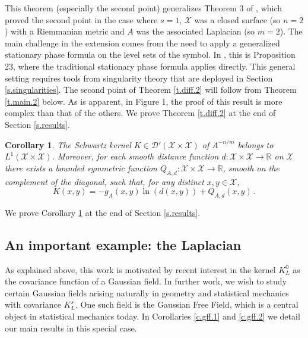 \documentclass[10pt,twoside]{article}
\newcommand{\R}{\mathbb{R}}
\newcommand{\man}{\mathcal{X}}
\numberwithin{theorem}{section}
\newtheorem{corollary}[theorem]{Corollary}
\begin{document}
This theorem (especially the second point) generalizes Theorem 3 of \cite{ale161}, which proved the second point in the case where  $s=1$, $\man$ was a closed surface (so $n=2$) with a Riemmanian metric and $A$ was the associated Laplacian (so $m=2$). The main challenge in the extension comes from the need to apply a generalized stationary phase formula on the level sets of the symbol. In \cite{ale161}, this is Proposition 23, where the traditional stationary phase formula applies directly. This general setting requires tools from singularity theory that are deployed in Section \ref{s.singularities}. The second point of Theorem \ref{t.diff.2} will follow from Theorem \ref{t.main.2} below. As is apparent, in Figure 1, the proof of this result is more complex than that of the others. We prove Theorem \ref{t.diff.2} at the end of Section \ref{s.results}.\\

\begin{corollary}\label{co.diff.1}
The Schwartz kernel $K\in\mathcal{D}'(\man\times\man)$ of $A^{-n/m}$ belongs to $L^1(\man\times\man)$.  Moreover, for each smooth distance function $d:\man\times\man\rightarrow\R$ on $\man$ there exists a bounded symmetric function $Q_{A,d}:\man\times\man\rightarrow\R$, smooth on the complement of the diagonal, such that, for any distinct $x,y\in\man$,
\[
K(x,y)=-g_A(x,y)\ln\left(d\left(x,y\right)\right)+Q_{A,d}(x,y)\, .
\]
\end{corollary}

We prove Corollary \ref{co.diff.1} at the end of Section \ref{s.results}.\\

\subsection{An important example: the Laplacian}

As explained above, this work is motivated by recent interest in the kernel $K^0_L$ as the covariance function of a Gaussian field. In further work, we wish to study certain Gaussian fields arising naturally in geometry and statistical mechanics with covariance $K^s_L$. One such field is the Gaussian Free Field, which is a central object in statistical mechanics today. In Corollaries \ref{c.gff.1} and \ref{c.gff.2} we detail our main results in this special case.\\
\end{document}
